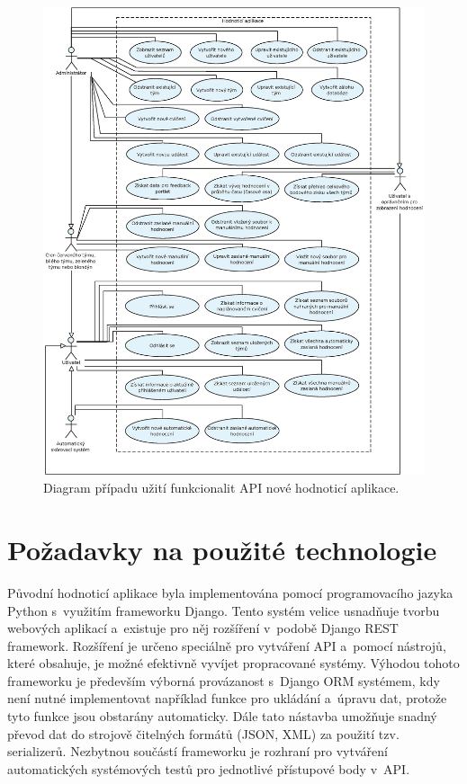 \documentclass[
  digital,
  twoside,
  table, 
  nolof, 
  nolot
]{fithesis3}
\begin{document}
\begin{figure}
    \centering
    \includegraphics[width=15cm]{images/Use-case-2.eps}
    \caption{Diagram případu užití funkcionalit API nové hodnoticí aplikace.}
    \label{fig:useCase2}
\end{figure}

\section{Požadavky na použité technologie}

Původní hodnoticí aplikace byla implementována pomocí programovacího jazyka Python s~využitím frameworku Django. Tento systém velice usnadňuje tvorbu webových aplikací a~existuje pro něj rozšíření v~podobě Django REST framework. Rozšíření je určeno speciálně pro vytváření API a~pomocí nástrojů, které obsahuje, je možné efektivně vyvíjet propracované systémy. Výhodou tohoto frameworku je především výborná provázanost s~Django ORM systémem, kdy není nutné implementovat například funkce pro ukládání a~úpravu dat, protože tyto funkce jsou obstarány automaticky. Dále tato nástavba umožňuje snadný převod dat do strojově čitelných formátů (JSON, XML) za použití tzv. serializerů. Nezbytnou součástí frameworku je rozhraní pro vytváření automatických systémových testů pro jednotlivé přístupové body v~API.
\end{document}
